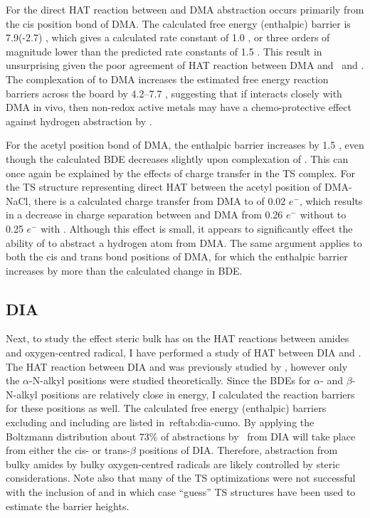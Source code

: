 For the direct HAT reaction between  and DMA abstraction occurs primarily from the cis position  bond of DMA. The calculated free energy (enthalpic) barrier is 7.9(-2.7) \kcalmol, which gives a calculated rate constant of 1.0  \Ms, or three orders of magnitude lower than the predicted rate constants of 1.5  \Ms. This result in unsurprising given the poor agreement of HAT reaction between DMA and \bno\ and \cumo. The complexation of  to DMA increases the estimated free energy reaction barriers across the board by 4.2--7.7 \kcalmol, suggesting that if  interacts closely with DMA in vivo, then non-redox active metals may have a chemo-protective effect against hydrogen abstraction by .

For the acetyl position  bond of DMA, the enthalpic barrier increases by 1.5 \kcalmol, even though the calculated BDE decreases slightly upon complexation of . This can once again be explained by the effects of charge transfer in the TS complex. For the TS structure representing direct HAT between  the acetyl position of DMA-NaCl, there is a calculated charge transfer from DMA to  of 0.02 $e^-$, which results in a decrease in charge separation between  and DMA from 0.26 $e^-$ without  to 0.25 $e^-$ with . Although this effect is small, it appears to significantly effect the ability of  to abstract a hydrogen atom from DMA. The same argument applies to both the cis and trans  bond positions of DMA, for which the enthalpic barrier increases by more than the calculated change in BDE.

\subsection{DIA}

Next, to study the effect steric bulk has on the HAT reactions between amides and oxygen-centred radical, I have performed a study of HAT between DIA and \cumo. The HAT reaction between DIA and \cumo was previously studied by \citet{Salamone2014}, however only the $\alpha$-N-alkyl positions were studied theoretically. Since the BDEs for $\alpha$- and $\beta$-N-alkyl  positions are relatively close in energy, I calculated the reaction barriers for these positions as well. The calculated free energy (enthalpic) barriers excluding and including  are listed in~ref{tab:dia-cumo}. By applying the Boltzmann distribution about 73\% of abstractions by \cumo\ from DIA will take place from either the cis- or trans-$\beta$ positions of DIA. Therefore, abstraction from bulky amides by bulky oxygen-centred radicals are likely controlled by steric considerations. Note also that many of the TS optimizations were not successful with the inclusion of  and in which case ``guess'' TS structures have been used to estimate the barrier heights.


